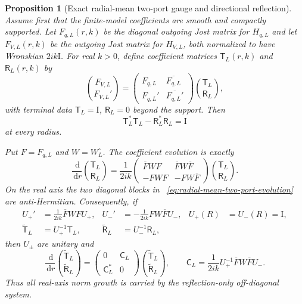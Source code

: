 \documentclass[11pt]{article}
\newcommand{\Id}{\mathrm I}
\newcommand{\dd}{\,\mathrm d}
\newtheorem{proposition}[theorem]{Proposition}
\theoremstyle{definition}
\theoremstyle{remark}
\begin{document}
\begin{proposition}[Exact radial-mean two-port gauge and directional reflection]
\label{prop:radial-mean-directional-reflection}
Assume first that the finite-model coefficients are smooth and compactly
supported.  Let $F_{q,L}(r,k)$ be the diagonal outgoing Jost matrix for
$H_{q,L}$ and let $F_{V,L}(r,k)$ be the outgoing Jost matrix for $H_{V,L}$,
both normalized to have Wronskian $2ik\Id$.  For real $k>0$, define coefficient
matrices $\mathsf T_L(r,k)$ and $\mathsf R_L(r,k)$ by
\begin{equation}
 \binom{F_{V,L}}{F_{V,L}'}
 =\begin{pmatrix}
   F_{q,L}&\overline{F_{q,L}}\\
   F_{q,L}'&\overline{F_{q,L}'}
  \end{pmatrix}
  \binom{\mathsf T_L}{\mathsf R_L},
 \label{eq:radial-mean-two-port-expansion}
\end{equation}
with terminal data $\mathsf T_L=\Id$, $\mathsf R_L=0$ beyond the support.
Then
\begin{equation}
 \mathsf T_L^*\mathsf T_L-\mathsf R_L^*\mathsf R_L=\Id
 \label{eq:radial-mean-two-port-flux}
\end{equation}
at every radius.

Put $F=F_{q,L}$ and $W=W_L^\circ$.  The coefficient evolution is exactly
\begin{equation}
 \frac{\dd}{\dd r}\binom{\mathsf T_L}{\mathsf R_L}
 =\frac1{2ik}
 \begin{pmatrix}
  \overline FWF&\overline FW\overline F\\
  -FWF&-FW\overline F
 \end{pmatrix}
 \binom{\mathsf T_L}{\mathsf R_L}.
 \label{eq:radial-mean-two-port-evolution}
\end{equation}
On the real axis the two diagonal blocks in
~\eqref{eq:radial-mean-two-port-evolution} are anti-Hermitian.  Consequently,
if
\begin{align}
 U_+'&=\frac1{2ik}\overline FWFU_+,
 &U_-'&=-\frac1{2ik}FW\overline FU_-,
 &U_+(R)&=U_-(R)=\Id,
 \label{eq:radial-mean-forward-gauges}\\
 \widetilde{\mathsf T}_L&=U_+^{-1}\mathsf T_L,
 &\widetilde{\mathsf R}_L&=U_-^{-1}\mathsf R_L,
\end{align}
then $U_\pm$ are unitary and
\begin{equation}
 \frac{\dd}{\dd r}
 \binom{\widetilde{\mathsf T}_L}{\widetilde{\mathsf R}_L}
 =\begin{pmatrix}0&\mathsf C_L\\\mathsf C_L^*&0\end{pmatrix}
 \binom{\widetilde{\mathsf T}_L}{\widetilde{\mathsf R}_L},
 \qquad
 \mathsf C_L
 =\frac1{2ik}U_+^{-1}\overline FW\overline FU_-.
 \label{eq:reflection-only-two-port-evolution}
\end{equation}
Thus all real-axis norm growth is carried by the reflection-only off-diagonal
system.


\end{proposition}
\end{document}
